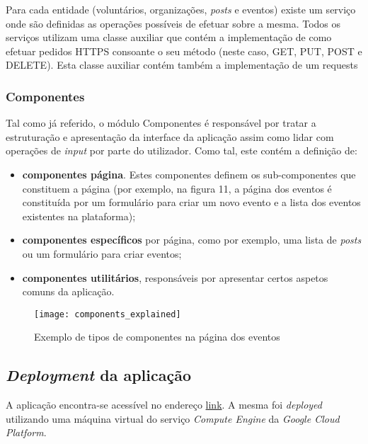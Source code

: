 \par \medskip

Para cada entidade (voluntários, organizações, \textit{posts} e eventos) existe um serviço onde são definidas as operações possíveis de efetuar sobre a mesma. Todos os serviços utilizam uma classe auxiliar que contém a implementação de como efetuar pedidos HTTPS consoante o seu método (neste caso, GET, PUT, POST e DELETE). Esta classe auxiliar contém também a implementação de um requests

\subsubsection{Componentes}

Tal como já referido, o módulo Componentes é responsável por tratar a estruturação e apresentação da interface da aplicação assim como lidar com operações de \textit{input} por parte do utilizador. Como tal, este contém a definição de:

\begin{itemize}
	\item \textbf{componentes página}. Estes componentes definem os sub-componentes que constituem a página (por exemplo, na figura 11, a página dos eventos é constituída por um formulário para criar um novo evento e a lista dos eventos existentes na plataforma);
	\item \textbf{componentes específicos} por página, como por exemplo, uma lista de \textit{posts} ou um formulário para criar eventos;
	\item \textbf{componentes utilitários}, responsáveis por apresentar certos aspetos comuns da aplicação.
\end{itemize}

\begin{figure}[h]
	\centering
	\texttt{[image: components\_explained]}
	\caption{Exemplo de tipos de componentes na página dos eventos}
\end{figure}

\subsection{\textit{Deployment} da aplicação}

A aplicação encontra-se acessível no endereço \href{https://tribute-app.duckdns.org/}{link}. A mesma foi \textit{deployed} utilizando uma máquina virtual do serviço \textit{Compute Engine} da \textit{Google Cloud Platform}.

\bigskip

